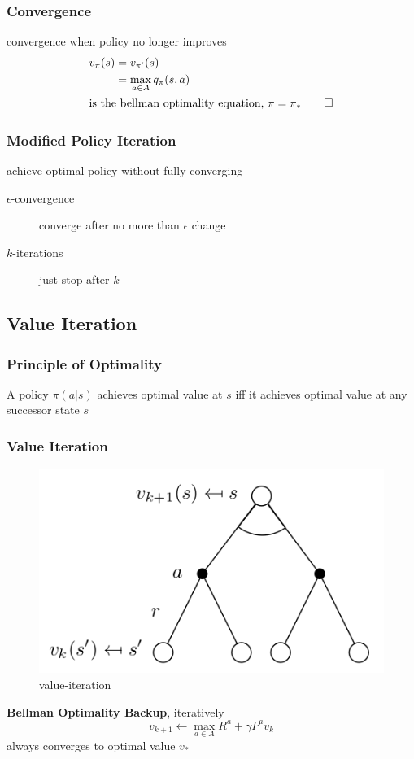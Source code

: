 \documentclass[]{article}
\theoremstyle{definition}
\begin{document}
\subsubsection{Convergence}
\label{ssub:convergence}
convergence when policy no longer improves
\begin{align*}
    v_\pi(s) &= v_{\pi'}(s) \\
             &= \max_{a \in A} q_\pi(s,a) \\
    \intertext{is the bellman optimality equation, $\pi = \pi_* \qed$}
\end{align*}

\subsubsection{Modified Policy Iteration}%
\label{ssub:modified_policy_iteration}
achieve optimal policy without fully converging

\begin{description}
    \item[$\epsilon$-convergence] converge after no more than $\epsilon$ change
    \item[$k$-iterations] just stop after $k$
\end{description}

\subsection{Value Iteration}
\label{sub:value_iteration}

\subsubsection{Principle of Optimality}%
\label{ssub:principle_of_optimality}

A policy $\pi(a|s)$ achieves optimal value at $s$ iff it achieves optimal value at any successor state $s$

\subsubsection{Value Iteration}%
\label{ssub:value_iteration}
\begin{figure}[htpb]
    \centering
    \includegraphics[width=0.5\linewidth]{value-iteration.png}
    \caption{value-iteration}
    \label{fig:value-iteration}
\end{figure}
\textbf{Bellman Optimality Backup}, iteratively
\begin{equation*}
    v_{k+1} \gets \max_{a \in A} R^a + \gamma P^a v_k
\end{equation*}
always converges to optimal value $v_*$
\end{document}

